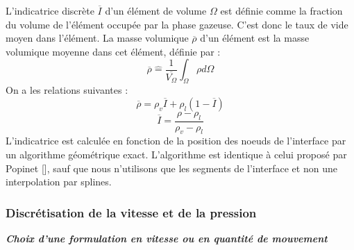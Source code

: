 L’indicatrice discrète $\overline{I}$ d’un \'el\'ement de volume $\Omega$ est d\'efinie comme la fraction du volume de l’\'el\'ement occup\'ee par la phase gazeuse. C’est donc le taux de vide moyen dans l’\'el\'ement. La masse volumique $\overline{\rho}$ d’un \'el\'ement est la masse volumique moyenne dans cet \'el\'ement, d\'efinie par :
\begin{equation}
\overline{\rho} \hat{=} \dfrac{1}{\overline{V_{\Omega}}} \int_{\Omega} \rho d\Omega
\end{equation}
On a les relations suivantes :
\begin{equation}
\overline{\rho} = \rho_{v} \overline{I} + \rho_{l} (1-\overline{I})
\end{equation}
\begin{equation}
\overline{I} = \dfrac{\rho - \rho_{l}}{\rho_{v} - \rho_{l}} \label{eq:Indicatrice_phase}
\end{equation}
L’indicatrice est calcul\'ee en fonction de la position des noeuds de l’interface par un algorithme g\'eom\'etrique exact. L’algorithme est identique à celui propos\'e par Popinet [\cite{Popinet2000}], sauf que nous n’utilisons que les segments de l’interface et non une interpolation par splines.

\subsubsection{Discr\'etisation de la vitesse et de la pression}

\textit{\textbf{Choix d’une formulation en vitesse ou en quantit\'e de mouvement}}\smallskip \\

